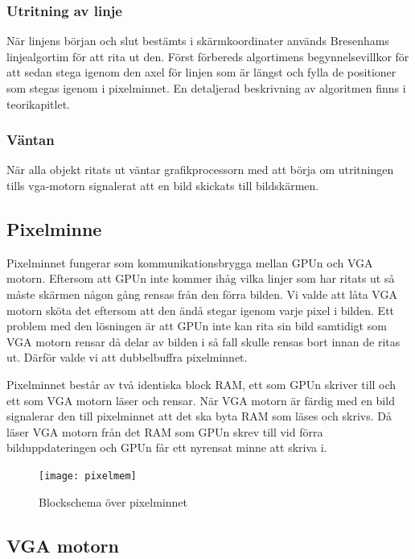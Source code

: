 \documentclass[a4paper]{article}
\begin{document}
    \subsubsection{Utritning av linje}
    När linjens början och slut bestämts i skärmkoordinater används Bresenhams
    linjealgortim för att rita ut den. Först förbereds algortimens
    begynnelsevillkor för att sedan stega igenom den axel för linjen som är
    längst och fylla de positioner som stegas igenom i pixelminnet. En
    detaljerad beskrivning av algoritmen finns i teorikapitlet. 

    \subsubsection{Väntan}

    När alla objekt ritats ut väntar grafikprocessorn med att börja om
    utritningen tills vga-motorn signalerat att en bild skickats till
    bildskärmen. 

    \subsection{Pixelminne}

    Pixelminnet fungerar som kommunikationsbrygga mellan GPUn och VGA motorn.
    Eftersom att GPUn inte kommer ihåg vilka linjer som har ritats ut så måste
    skärmen någon gång rensas från den förra bilden. Vi valde att låta VGA motorn
    sköta det eftersom att den ändå stegar igenom varje pixel i bilden. Ett problem
    med den lösningen är att GPUn inte kan rita sin bild samtidigt som VGA motorn
    rensar då delar av bilden i så fall skulle rensas bort innan de ritas ut. Därför
    valde vi att dubbelbuffra pixelminnet. 

    Pixelminnet består av två identiska block RAM, ett som GPUn skriver till och ett
    som VGA motorn läser och rensar. När VGA motorn är färdig med en bild signalerar
    den till pixelminnet att det ska byta RAM som läses och skrivs. Då läser VGA
    motorn från det RAM som GPUn skrev till vid förra bilduppdateringen och GPUn får
    ett nyrensat minne att skriva i. 

    \begin{figure}[H]
        \centering
        \texttt{[image: pixelmem]}
        \caption{Blockschema över pixelminnet}
        \label{fig:pixelmem}
    \end{figure}

    \subsection{VGA motorn}
\end{document}
